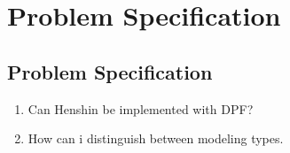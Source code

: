 
\chapter{Problem Specification} %

\label{Chapter4} %



\section{Problem Specification}

\begin{enumerate}
  
  
  \item Can Henshin be implemented with DPF?
  
  \item How can i distinguish between modeling types. 

\end{enumerate}




